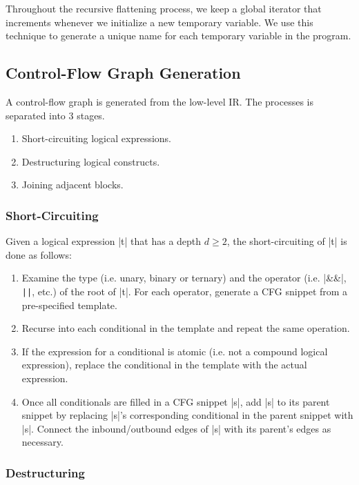Throughout the recursive flattening process, we keep a global iterator that increments whenever we initialize a new temporary variable. We use this technique to generate a unique name for each temporary variable in the program.

\subsection{Control-Flow Graph Generation}

A control-flow graph is generated from the low-level IR. The processes is separated into 3 stages.
\begin{enumerate}
    \item Short-circuiting logical expressions.
    \item Destructuring logical constructs.
    \item Joining adjacent blocks.
\end{enumerate}

\subsubsection{Short-Circuiting}

Given a logical expression |t| that has a depth $d \geq 2$, the short-circuiting of |t| is done as follows:
\begin{enumerate}
    \item Examine the type (i.e. unary, binary or ternary) and the operator (i.e. |&&|, \lstinline{||}, etc.) of the root of |t|. For each operator, generate a CFG snippet from a pre-specified template.
    \item Recurse into each conditional in the template and repeat the same operation.
    \item If the expression for a conditional is atomic (i.e. not a compound logical expression), replace the conditional in the template with the actual expression.
    \item Once all conditionals are filled in a CFG snippet |s|, add |s| to its parent snippet by replacing |s|'s corresponding conditional in the parent snippet with |s|. Connect the inbound/outbound edges of |s| with its parent's edges as necessary.
\end{enumerate}

\subsubsection{Destructuring}

